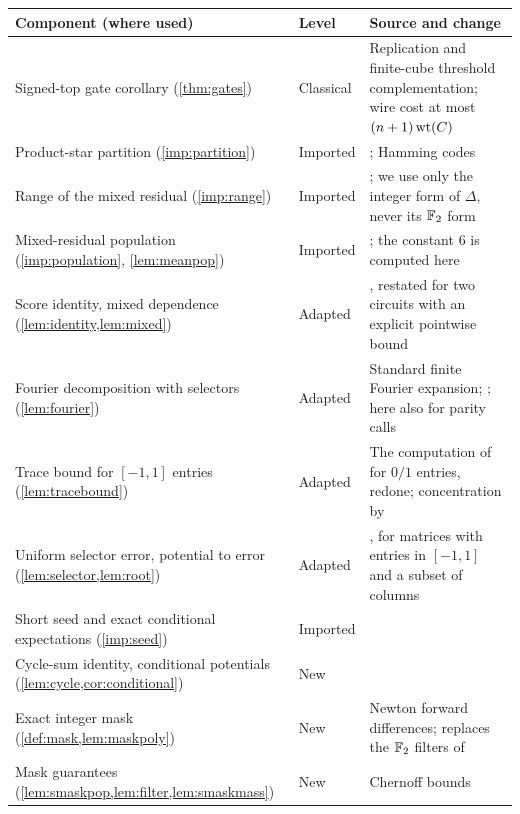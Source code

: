 \begin{table}[!htbp]
\centering\footnotesize
\begin{tabularx}{\textwidth}{@{}>{\raggedright\arraybackslash}p{}>{\raggedright\arraybackslash}p{}>{\raggedright\arraybackslash}X@{}}
\toprule
Component (where used) & Level & Source and change\\
\midrule
Signed-top gate corollary (\cref{thm:gates}) & Classical & Replication and finite-cube threshold complementation; wire cost at most \((n+1)\operatorname{wt}(C)\)\\
Product-star partition (\cref{imp:partition}) & Imported & \cite[Lemma~A.1]{Nag72}; Hamming codes~\cite{Hamming}\\
Range of the mixed residual (\cref{imp:range}) & Imported & \cite[Lemma~A.2]{Nag72}; we use only the integer form of \(\Delta\), never its \(\mathbb F_2\) form\\
Mixed-residual population (\cref{imp:population}, \cref{lem:meanpop}) & Imported & \cite[Theorem~A.4]{Nag72}; the constant \(6\) is computed here\\
Score identity, mixed dependence (\cref{lem:identity,lem:mixed}) & Adapted & \cite[Lemma~A.2 and the proof of Theorem~A.4]{Nag72}, restated for two circuits with an explicit pointwise bound\\
Fourier decomposition with selectors (\cref{lem:fourier}) & Adapted & Standard finite Fourier expansion; \cite[Equation~(29)]{Nag72}; here also for parity calls\\
Trace bound for \([-1,1]\) entries (\cref{lem:tracebound}) & Adapted & The computation of~\cite[Lemma~F.1]{Nag72} for \(0/1\) entries, redone; concentration by~\cite[Theorem~1.6]{Tropp}\\
Uniform selector error, potential to error (\cref{lem:selector,lem:root}) & Adapted & \cite[Lemma~F.1 and its proof]{Nag72}, for matrices with entries in \([-1,1]\) and a subset of columns\\
Short seed and exact conditional expectations (\cref{imp:seed}) & Imported & \cite[Lemma~F.2 and its proof]{Nag72}\\
Cycle-sum identity, conditional potentials (\cref{lem:cycle,cor:conditional}) & New & \\
Exact integer mask (\cref{def:mask,lem:maskpoly}) & New & Newton forward differences; replaces the \(\mathbb F_2\) filters of~\cite[Appendix~D]{Nag72}\\
Mask guarantees (\cref{lem:smaskpop,lem:filter,lem:smaskmass}) & New & Chernoff bounds\\

\end{tabularx}
\end{table}
